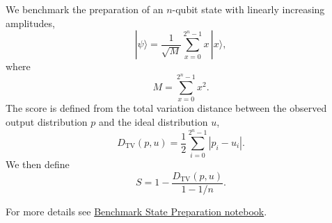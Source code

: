 We benchmark the preparation of an \(n\)-qubit state with linearly increasing amplitudes,
\[
|\psi\rangle = \frac{1}{\sqrt{M}} \sum_{x=0}^{2^n-1} x \, |x\rangle ,
\]
where
\[
M = \sum_{x=0}^{2^n-1} x^2 .
\]
The score is defined from the total variation distance between the observed output distribution \(p\) and the ideal distribution \(u\),
\[
D_{\mathrm{TV}}(p,u) = \frac{1}{2}\sum_{i=0}^{2^n-1} |p_i-u_i| .
\]
We then define
\[
S = 1 - \frac{D_{\mathrm{TV}}(p,u)}{1-1/n}.
\]
\smallskip

For more details see \href{https://github.com/Classiq/classiq-library/tree/main/benchmarking/benchmarks/benchmark\_state\_preparation.ipynb}{Benchmark State Preparation notebook}.
\medskip
